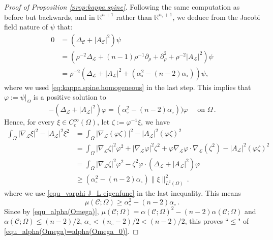 \documentclass[11pt, letterpaper, reqno]{amsart}
\numberwithin{equation}{section}
\theoremstyle{remark}
\newcommand{\RR}{\mathbb{R}}
\newcommand{\cC}{\mathcal{C}}
\newcommand{\cL}{\mathcal{L}}
\begin{document}
\begin{proof}[Proof of Proposition \ref{prop:kappa.spine}]
	Following the same computation as before but backwards, and in $\RR^{n+1}$ rather than $\RR^{n_\circ+1}$, we deduce from the Jacobi field nature of $\psi$ that:
	\begin{align*}
		0   & = (\Delta_{\cC} + |A_{\cC}|^2) \psi \\
			& = \left(\rho^{-2} \Delta_{\cL} + (n-1) \rho^{-1} \partial_\rho + \partial_\rho^2 + \rho^{-2} |A_{\cL}|^2\right) \psi \\
			& = \rho^{-2} (\Delta_{\cL} + |A_{\cL}|^2 + (\alpha_{\circ}^2 - (n-2) \alpha_{\circ})) \psi,
	\end{align*}
	where we used \eqref{eq:kappa.spine.homogeneous} in the last step. This implies that $\varphi:= \psi|_{\Omega}$ is a positive solution to 
    \begin{equation} \label{equ_varphi J_L eigenfunc}
      -(\Delta_{\cL} + |A_{\cL}|^2)\varphi = (\alpha_{\circ}^2 - (n-2) \alpha_{\circ})) \varphi \quad \text{ on }\Omega\,.         
    \end{equation}
    Hence, for every $\xi\in C^\infty_c(\Omega)$, let $\zeta:= \varphi^{-1}\xi$, we have 
    \begin{align*}
      \int_\Omega |\nabla_\cL\xi|^2 - |A_\cL|^2\xi^2 
      & = \int_\Omega |\nabla_\cL(\varphi\zeta)|^2 - |A_\cL|^2(\varphi\zeta)^2 \\
      & = \int_\Omega |\nabla_\cL\zeta|^2\varphi^2 + |\nabla_\cL\varphi|^2\zeta^2 + \varphi\nabla_\cL\varphi\cdot \nabla_\cL(\zeta^2) - |A_\cL|^2(\varphi\zeta)^2 \\
      & = \int_\Omega |\nabla_\cL\zeta|^2\varphi^2 - \zeta^2\varphi\cdot (\Delta_\cL + |A_\cL|^2)\varphi \\
      & \geq (\alpha_\circ^2 - (n-2)\alpha_\circ)\|\xi\|_{L^2(\Omega)}^2 \,.
    \end{align*}
    where we use \eqref{equ_varphi J_L eigenfunc} in the last inequality. This means \[
      \mu(\cC; \Omega) \geq \alpha_\circ^2 - (n-2)\alpha_\circ\,.
    \]
    Since by \eqref{equ_alpha(Omega)}, $\mu(\cC; \Omega) = \alpha(\cC; \Omega)^2 - (n-2)\alpha(\cC; \Omega)$ and $\alpha(\cC;\Omega)\leq (n-2)/2$, $\alpha_\circ< (n_\circ-2)/2<(n-2)/2$, this proves ``$\leq$" of \eqref{equ_alpha(Omega)=alpha(Omega_0)}.


\end{proof}
\end{document}
